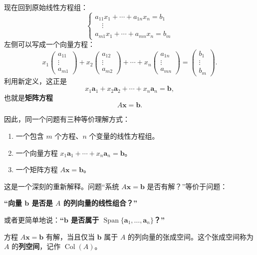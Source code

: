 现在回到原始线性方程组：
\[
\begin{cases}
a_{11}x_1+\cdots+a_{1n}x_n=b_1\\
\quad\vdots\\
a_{m1}x_1+\cdots+a_{mn}x_n=b_m
\end{cases}
\]
左侧可以写成一个向量方程：
\[
x_1\begin{pmatrix}a_{11}\\\vdots\\a_{m1}\end{pmatrix}
+x_2\begin{pmatrix}a_{12}\\\vdots\\a_{m2}\end{pmatrix}
+\cdots+x_n\begin{pmatrix}a_{1n}\\\vdots\\a_{mn}\end{pmatrix}
=\begin{pmatrix}b_1\\\vdots\\b_m\end{pmatrix}.
\]
利用新定义，这正是
\[ x_1\mathbf{a}_1+x_2\mathbf{a}_2+\cdots+x_n\mathbf{a}_n=\mathbf{b}, \]
也就是\textbf{矩阵方程}
\[ A\mathbf{x}=\mathbf{b}. \]

因此，同一个问题有三种等价理解方式：
\begin{enumerate}
    \item 一个包含 $m$ 个方程、$n$ 个变量的线性方程组。
    \item 一个向量方程 $x_1\mathbf{a}_1+\cdots+x_n\mathbf{a}_n=\mathbf{b}$。
    \item 一个矩阵方程 $A\mathbf{x}=\mathbf{b}$。
\end{enumerate}

这是一个深刻的重新解释。问题“系统 $A\mathbf{x}=\mathbf{b}$ 是否有解？”等价于问题：

\begin{center}
\textbf{“向量 $\mathbf{b}$ 是否是 $A$ 的列向量的线性组合？”}
\end{center}
或者更简单地说：\textbf{“$\mathbf{b}$ 是否属于 $\operatorname{Span}\{\mathbf{a}_1,\ldots,\mathbf{a}_n\}$？”}

\begin{theorem}
方程 $A\mathbf{x}=\mathbf{b}$ 有解，当且仅当 $\mathbf{b}$ 属于 $A$ 的列向量的张成空间。这个张成空间称为 $A$ 的\textbf{列空间}，记作 $\operatorname{Col}(A)$。
\end{theorem}

